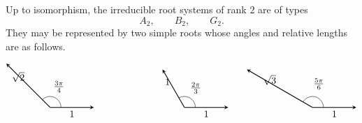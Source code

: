 \begin{example}
    Up to isomorphism, the irreducible root systems of rank \(2\) are of types
    \[
        A_2,\qquad B_2,\qquad G_2 .
    \]
    They may be represented by two simple roots whose angles and relative
    lengths are as follows.

    \[
        \begin{tikzpicture}[scale=1.15, >=stealth]

            \begin{scope}[shift={(0,0)}]
                \coordinate (O) at (0,0);
                \coordinate (a) at (1.4,0);
                \coordinate (b) at ({1.4*sqrt(2)*cos(135)},{1.4*sqrt(2)*sin(135)});

                \draw[->, thick] (O) -- (a) node[midway, below] {\(1\)};
                \draw[->, thick] (O) -- (b) node[midway, above left] {\(\sqrt{2}\)};
                \draw (0.35,0) arc[start angle=0,end angle=135,radius=0.35];
                \node at (67:0.72) {\(\frac{3\pi}{4}\)};
            \end{scope}

            \begin{scope}[shift={(4.3,0)}]
                \coordinate (O) at (0,0);
                \coordinate (a) at (1.4,0);
                \coordinate (b) at ({1.4*cos(120)},{1.4*sin(120)});

                \draw[->, thick] (O) -- (a) node[midway, below] {\(1\)};
                \draw[->, thick] (O) -- (b) node[midway, above left] {\(1\)};
                \draw (0.35,0) arc[start angle=0,end angle=120,radius=0.35];
                \node at (60:0.72) {\(\frac{2\pi}{3}\)};
            \end{scope}

            \begin{scope}[shift={(8.4,0)}]
                \coordinate (O) at (0,0);
                \coordinate (a) at (1.4,0);
                \coordinate (b) at ({1.4*sqrt(3)*cos(150)},{1.4*sqrt(3)*sin(150)});

                \draw[->, thick] (O) -- (a) node[midway, below] {\(1\)};
                \draw[->, thick] (O) -- (b) node[midway, above left] {\(\sqrt{3}\)};
                \draw (0.35,0) arc[start angle=0,end angle=150,radius=0.35];
                \node at (75:0.78) {\(\frac{5\pi}{6}\)};
            \end{scope}

        \end{tikzpicture}
    \]
\end{example}

